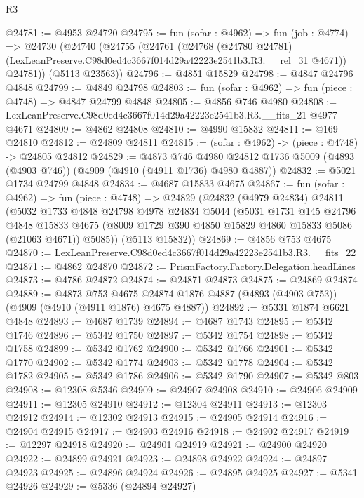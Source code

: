 \begin{lexlean}{R3}
\begin{coremodule}
@24781 := @4953 @24720
@24795 := fun (sofar : @4962) =>
  fun (job : @4774) =>
  @24730
    (@24740
      (@24755
        (@24761
          (@24768
            (@24780 @24781)
            (LexLeanPreserve.C98d0ed4c3667f014d29a42223e2541b3.R3.__rel_31 @4671))
          @24781))
      (@5113 @23563))
@24796 := @4851 @15829
@24798 := @4847 @24796 @4848
@24799 := @4849 @24798
@24803 := fun (sofar : @4962) => fun (piece : @4748) => @4847 @24799 @4848
@24805 := @4856 @746 @4980
@24808 := LexLeanPreserve.C98d0ed4c3667f014d29a42223e2541b3.R3.__fits_21 @4977 @4671
@24809 := @4862 @24808
@24810 := @4990 @15832
@24811 := @169 @24810
@24812 := @24809 @24811
@24815 := (sofar : @4962) -> (piece : @4748) -> @24805 @24812
@24829 := @4873
    @746
    @4980
    @24812
    @1736
    @5009
    (@4893 (@4903 @746))
    (@4909 (@4910 (@4911 @1736) @4980 @4887))
@24832 := @5021 @1734 @24799 @4848
@24834 := @4687 @15833 @4675
@24867 := fun (sofar : @4962) =>
  fun (piece : @4748) =>
  @24829
    (@24832
      (@4979 @24834)
      @24811
      (@5032
        @1733
        @4848
        @24798
        @4978
        @24834
        @5044
        (@5031
          @1731
          @145
          @24796
          @4848
          @15833
          @4675
          (@8009 @1729 @390 @4850 @15829 @4860 @15833 @5086 (@21063 @4671))
          @5085))
      (@5113 @15832))
@24869 := @4856 @753 @4675
@24870 := LexLeanPreserve.C98d0ed4c3667f014d29a42223e2541b3.R3.__fits_22
@24871 := @4862 @24870
@24872 := PrismFactory.Factory.Delegation.headLines
@24873 := @4786 @24872
@24874 := @24871 @24873
@24875 := @24869 @24874
@24889 := @4873
    @753
    @4675
    @24874
    @1876
    @4887
    (@4893 (@4903 @753))
    (@4909 (@4910 (@4911 @1876) @4675 @4887))
@24892 := @5331 @1874 @6621 @4848
@24893 := @4687 @1739
@24894 := @4687 @1743
@24895 := @5342 @1746
@24896 := @5342 @1750
@24897 := @5342 @1754
@24898 := @5342 @1758
@24899 := @5342 @1762
@24900 := @5342 @1766
@24901 := @5342 @1770
@24902 := @5342 @1774
@24903 := @5342 @1778
@24904 := @5342 @1782
@24905 := @5342 @1786
@24906 := @5342 @1790
@24907 := @5342 @803
@24908 := @12308 @5346
@24909 := @24907 @24908
@24910 := @24906 @24909
@24911 := @12305 @24910
@24912 := @12304 @24911
@24913 := @12303 @24912
@24914 := @12302 @24913
@24915 := @24905 @24914
@24916 := @24904 @24915
@24917 := @24903 @24916
@24918 := @24902 @24917
@24919 := @12297 @24918
@24920 := @24901 @24919
@24921 := @24900 @24920
@24922 := @24899 @24921
@24923 := @24898 @24922
@24924 := @24897 @24923
@24925 := @24896 @24924
@24926 := @24895 @24925
@24927 := @5341 @24926
@24929 := @5336 (@24894 @24927)

\end{coremodule}
\end{lexlean}
